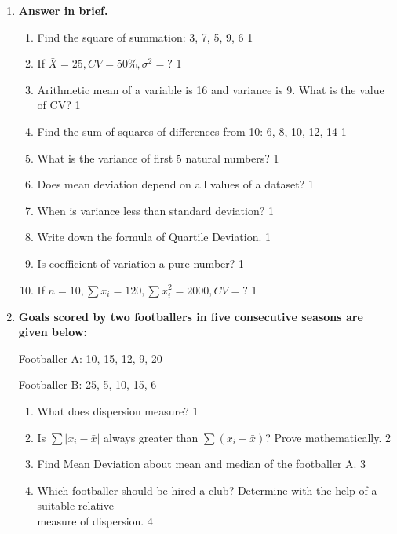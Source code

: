 \documentclass{exam}
\begin{document}
\begin{enumerate}

\item \textbf{Answer in brief.}

\begin{enumerate}

   \item Find the square of summation: 3, 7, 5, 9, 6 \hfill 1  
   \item If $\bar X = 25, CV = 50\%, \sigma^2=?$ \hfill 1
   \item Arithmetic mean of a variable is 16 and variance is 9. What is the value of CV? \hfill 1
   \item Find the sum of squares of differences from 10: 6, 8, 10, 12, 14 \hfill 1  
   \item What is the variance of first 5 natural numbers? \hfill 1
    \item Does mean deviation depend on all values of a dataset? \hfill 1
    \item When is variance less than standard deviation? \hfill 1
    \item Write down the formula of Quartile Deviation. \hfill 1
    \item Is coefficient of variation a pure number? \hfill 1
    \item If $n=10, \sum x_i = 120, \sum x_i^2=2000, CV=?$ \hfill 1


\end{enumerate}

    \item
  \textbf{Goals scored by two footballers in five consecutive seasons are given below:}

    \begin{center}

    Footballer A: 10, 15, 12, 9, 20

    Footballer B: 25, 5, 10, 15, 6
    
    \end{center}
  \begin{enumerate}
  \item What does dispersion measure?  \hfill 1
   \item Is $\sum |x_i-\bar x|$ always greater than $\sum (x_i-\bar x)$? Prove mathematically. \hfill 2
    \item  
	Find Mean Deviation about mean and median of the footballer A.  \hfill 3
    \item
	Which footballer should be hired a club? Determine with the help of a suitable relative \\ measure of dispersion. \hfill 4
\end{enumerate}

\end{enumerate}
\end{document}
